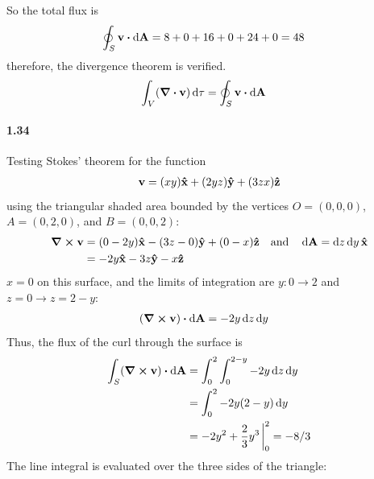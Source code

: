\documentclass[../main.tex]{subfiles}
\begin{document}
So the total flux is
\begin{align*}
    \oint_S \vb{v} \vdot \dd{\vb{A}} &= 8 + 0 + 16 + 0 + 24 + 0 = 48
\end{align*}
therefore, the divergence theorem is verified.
\begin{align*}
    \int_V (\div{\vb{v}}) \dd{\tau} &= \oint_S \vb{v} \vdot \dd{\vb{A}}
\end{align*}

\newpage
\paragraph{1.34}
Testing Stokes' theorem for the function
\begin{align*}
    \vb{v} = (xy) \vu{x} + (2yz) \vu{y} + (3zx)\vu{z}
\end{align*}
using the triangular shaded area bounded by the vertices
$O = (0,0,0)$, $A = (0,2,0)$, and $B = (0,0,2)$:
\begin{align*}
    \curl{\vb{v}} &= (0 - 2y) \vu{x} - (3z - 0) \vu{y} + (0 - x) \vu{z}
                                                        \qand \dd{\vb{A}} = \dd{z}\dd{y} \vu{x} \\
                  &= -2y \vu{x} - 3z \vu{y} - x \vu{z}
\end{align*}
$x=0$ on this surface, and the limits of integration are $y: 0 \to 2$ and $z = 0 \to z = 2 - y$:
\begin{align*}
    (\curl{\vb{v}}) \vdot \dd{\vb{A}} &= -2y \dd{z}\dd{y}
\end{align*}
Thus, the flux of the curl through the surface is
\begin{align*}
    \int_S (\curl{\vb{v}}) \vdot \dd{\vb{A}} &= \int_0^2 \int_0^{2-y} -2y \dd{z}\dd{y} \\
    &= \int_0^2 -2y(2-y) \dd{y} \\
    &= -2y^2 + \frac{2}{3} y^3 \eval_0^2 = -8/3
\end{align*}
The line integral is evaluated over the three sides of the triangle:
\end{document}
